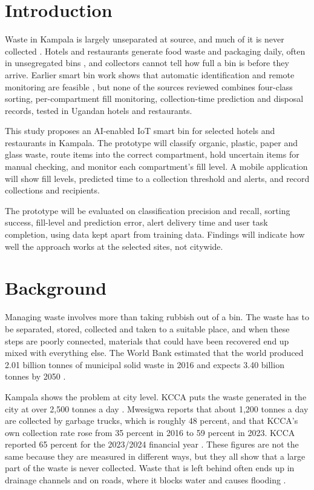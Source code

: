 \section{Introduction}

Waste in Kampala is largely unseparated at source, and much of it is never collected \cite{kcca2026,mwesigwa}. Hotels and restaurants generate food waste and packaging daily, often in unsegregated bins \cite{walina,ssepuuya}, and collectors cannot tell how full a bin is before they arrive. Earlier smart bin work shows that automatic identification and remote monitoring are feasible \cite{musoke,turyahebwa,ahmed,white}, but none of the sources reviewed combines four-class sorting, per-compartment fill monitoring, collection-time prediction and disposal records, tested in Ugandan hotels and restaurants.

This study proposes an AI-enabled IoT smart bin for selected hotels and restaurants in Kampala. The prototype will classify organic, plastic, paper and glass waste, route items into the correct compartment, hold uncertain items for manual checking, and monitor each compartment's fill level. A mobile application will show fill levels, predicted time to a collection threshold and alerts, and record collections and recipients.

The prototype will be evaluated on classification precision and recall, sorting success, fill-level and prediction error, alert delivery time and user task completion, using data kept apart from training data. Findings will indicate how well the approach works at the selected sites, not citywide.

\section{Background}

Managing waste involves more than taking rubbish out of a bin. The waste has to be separated, stored, collected and taken to a suitable place, and when these steps are poorly connected, materials that could have been recovered end up mixed with everything else. The World Bank estimated that the world produced 2.01 billion tonnes of municipal solid waste in 2016 and expects 3.40 billion tonnes by 2050 \cite{kaza}.

Kampala shows the problem at city level. KCCA puts the waste generated in the city at over 2,500 tonnes a day \cite{kcca2026}. Mwesigwa \cite{mwesigwa} reports that about 1,200 tonnes a day are collected by garbage trucks, which is roughly 48 percent, and that KCCA's own collection rate rose from 35 percent in 2016 to 59 percent in 2023. KCCA reported 65 percent for the 2023/2024 financial year \cite{kcca2024a}. These figures are not the same because they are measured in different ways, but they all show that a large part of the waste is never collected. Waste that is left behind often ends up in drainage channels and on roads, where it blocks water and causes flooding \cite{ngwomoya,mwesigwa}.

